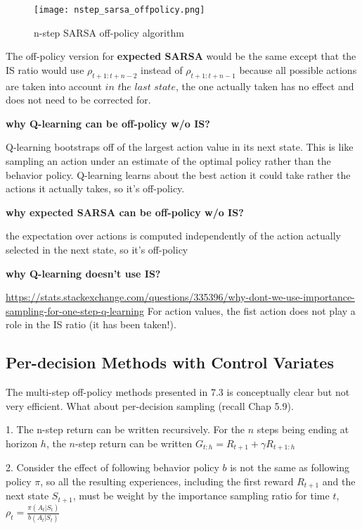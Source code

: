 \documentclass[sutton_barto_notes.tex]{subfiles}
\begin{document}
\begin{figure}[h!]
    \centering
     \texttt{[image: nstep\_sarsa\_offpolicy.png]}
    \caption{ n-step SARSA off-policy algorithm }
\end{figure}

The off-policy version for \textbf{expected SARSA} would be the same except that the IS ratio would use $\rho_{t+1:t+n-2}$ instead of $\rho_{t+1:t+n-1}$ because all possible actions are taken into account $\textit{in the last state}$, the one actually taken has no effect and does not need to be corrected for.

\textbf{why Q-learning can be off-policy w/o IS?}

Q-learning bootstraps off of the largest action value in its next state. This is like sampling an action under an estimate of the optimal policy rather than the behavior policy. Q-learning learns about the best action it could take rather the actions it actually takes, so it's off-policy.

\textbf{why expected SARSA can be off-policy w/o IS?}

the expectation over actions is computed independently of the action actually selected in the next state, so it's off-policy

\textbf{why Q-learning doesn't use IS?}

\url{https://stats.stackexchange.com/questions/335396/why-dont-we-use-importance-sampling-for-one-step-q-learning}
For action values, the fist action does not play a role in the IS ratio (it has been taken!).


\subsection{Per-decision Methods with Control Variates}

The multi-step off-policy methods presented in 7.3 is conceptually clear but not very efficient. What about per-decision sampling (recall Chap 5.9).

1. The n-step return can be written recursively. For the $n$ steps being ending at horizon $h$, the $n$-step return can be written $G_{t:h} = R_{t+1} + \gamma R_{t+1:h}$

2. Consider the effect of following behavior policy $b$ is not the same as following policy $\pi$, so all the resulting experiences, including the first reward $R_{t+1}$ and the next state $S_{t+1}$, must be weight by the importance sampling ratio for time $t$, $\rho_t = \frac{\pi(A_t|S_t)}{b(A_t|S_t)}$
\end{document}

